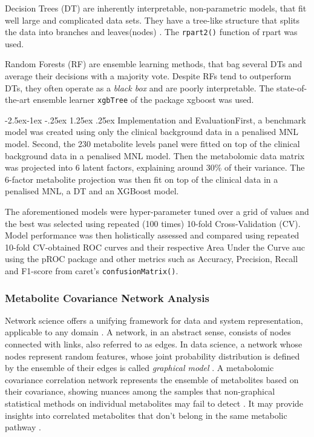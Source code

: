 \documentclass{amsart}
\makeatletter
\renewcommand\paragraph{\@startsection{paragraph}{4}{\z@}%
            {-2.5ex\@plus -1ex \@minus -.25ex}%
            {1.25ex \@plus .25ex}%
            {\normalfont\normalsize\bfseries}}
\makeatother
\begin{document}
Decision Trees (DT) are inherently interpretable, non-parametric models, that fit well large and complicated data sets. They have a tree-like structure that splits the data into branches and leaves(nodes) \cite{Song2015DecisionPrediction}. The \texttt{rpart2()} \cite{rpart} function of \textsf{rpart} was used.

Random Forests (RF) are ensemble learning methods, that bag several DTs and average their decisions with a majority vote. Despite RFs tend to outperform DTs, they often operate as a \textit{black box} and are poorly interpretable. The state-of-the-art ensemble learner \texttt{xgbTree} of the package \textsf{xgboost} \cite{Chen2016XGBoost:System} was used.

\paragraph{Implementation and Evaluation}First, a benchmark model was created using only the clinical background data in a penalised MNL model. Second, the 230 metabolite levels panel were fitted on top of the clinical background data in a penalised MNL model. Then the metabolomic data matrix was projected into 6 latent factors, explaining around 30\% of their variance. The 6-factor metabolite projection was then fit on top of the clinical data in a penalised MNL, a DT and an XGBoost model.

The aforementioned models were hyper-parameter tuned over a grid of values and the best was selected using repeated (100 times) 10-fold Cross-Validation (CV). Model performance was then holistically assessed and compared using repeated 10-fold CV-obtained ROC curves and their respective Area Under the Curve \acrshort{auc} using the \textsf{pROC} package \cite{pROC} and other metrics such as Accuracy, Precision, Recall and F1-score from \textsf{caret}'s \texttt{confusionMatrix()}.

\subsubsection{Metabolite Covariance Network Analysis}
Network science offers a unifying framework for data and system representation, applicable to any domain \cite{Barabasi2015NetworkScience}. A network, in an abstract sense, consists of nodes connected with links, also referred to as edges. In data science, a network whose nodes represent random features, whose joint probability distribution is defined by the ensemble of their edges is called \textit{graphical model} \cite{Peeters2022Rags2ridges:Matrices}. A metabolomic covariance correlation network represents the ensemble of metabolites based on their covariance, showing nuances among the samples that non-graphical statistical methods on individual metabolites may fail to detect \cite{PerezDeSouza2020Network-basedInterpretation}. It may provide insights into correlated metabolites that don't belong in the same metabolic pathway \cite{PerezDeSouza2020Network-basedInterpretation}.
\end{document}
